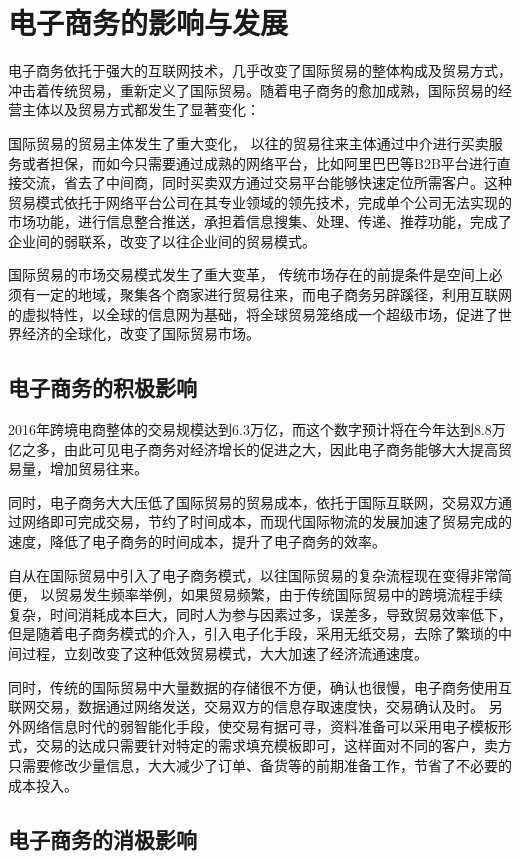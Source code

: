 \chapter{电子商务的影响与发展}
电子商务依托于强大的互联网技术，几乎改变了国际贸易的整体构成及贸易方式，冲击着传统贸易，重新定义了国际贸易。随着电子商务的愈加成熟，国际贸易的经营主体以及贸易方式都发生了显著变化：

国际贸易的贸易主体发生了重大变化，
以往的贸易往来主体通过中介进行买卖服务或者担保，而如今只需要通过成熟的网络平台，比如阿里巴巴等B2B平台进行直接交流，省去了中间商，同时买卖双方通过交易平台能够快速定位所需客户。这种贸易模式依托于网络平台公司在其专业领域的领先技术，完成单个公司无法实现的市场功能，进行信息整合推送，承担着信息搜集、处理、传递、推荐功能，完成了企业间的弱联系，改变了以往企业间的贸易模式。

国际贸易的市场交易模式发生了重大变革，
传统市场存在的前提条件是空间上必须有一定的地域，聚集各个商家进行贸易往来，而电子商务另辟蹊径，利用互联网的虚拟特性，以全球的信息网为基础，将全球贸易笼络成一个超级市场，促进了世界经济的全球化，改变了国际贸易市场。

\section{电子商务的积极影响}
2016年跨境电商整体的交易规模达到6.3万亿，而这个数字预计将在今年达到8.8万亿之多，由此可见电子商务对经济增长的促进之大，因此电子商务能够大大提高贸易量，增加贸易往来。

同时，电子商务大大压低了国际贸易的贸易成本，依托于国际互联网，交易双方通过网络即可完成交易，节约了时间成本，而现代国际物流的发展加速了贸易完成的速度，降低了电子商务的时间成本，提升了电子商务的效率。

自从在国际贸易中引入了电子商务模式，以往国际贸易的复杂流程现在变得非常简便，
以贸易发生频率举例，如果贸易频繁，由于传统国际贸易中的跨境流程手续复杂，时间消耗成本巨大，同时人为参与因素过多，误差多，导致贸易效率低下，
但是随着电子商务模式的介入，引入电子化手段，采用无纸交易，去除了繁琐的中间过程，立刻改变了这种低效贸易模式，大大加速了经济流通速度。

同时，传统的国际贸易中大量数据的存储很不方便，确认也很慢，电子商务使用互联网交易，数据通过网络发送，交易双方的信息存取速度快，交易确认及时。
另外网络信息时代的弱智能化手段，使交易有据可寻，资料准备可以采用电子模板形式，交易的达成只需要针对特定的需求填充模板即可，这样面对不同的客户，卖方只需要修改少量信息，大大减少了订单、备货等的前期准备工作，节省了不必要的成本投入。

\section{电子商务的消极影响}

